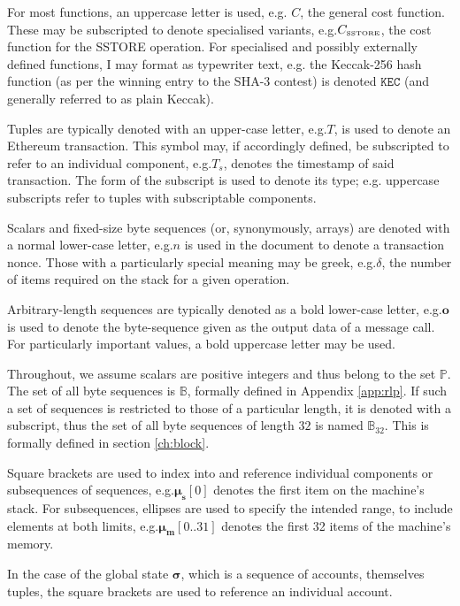 \documentclass[9pt,oneside]{amsart}
\makeatletter
\newcommand*\eg{e.g.\@\xspace}
\makeatother
\begin{document}
\begin{multicols}{2}
For most functions, an uppercase letter is used, e.g. $C$, the general cost function. These may be subscripted to denote specialised variants, \eg $C_\text{\tiny SSTORE}$, the cost function for the {\tiny SSTORE} operation. For specialised and possibly externally defined functions, I may format as typewriter text, \eg the Keccak-256 hash function (as per the winning entry to the SHA-3 contest) is denoted $\texttt{KEC}$ (and generally referred to as plain Keccak).

Tuples are typically denoted with an upper-case letter, \eg $T$, is used to denote an Ethereum transaction. This symbol may, if accordingly defined, be subscripted to refer to an individual component, \eg $T_s$, denotes the timestamp of said transaction. The form of the subscript is used to denote its type; \eg uppercase subscripts refer to tuples with subscriptable components.

Scalars and fixed-size byte sequences (or, synonymously, arrays) are denoted with a normal lower-case letter, \eg $n$ is used in the document to denote a transaction nonce. Those with a particularly special meaning may be greek, \eg $\delta$, the number of items required on the stack for a given operation.

Arbitrary-length sequences are typically denoted as a bold lower-case letter, \eg $\mathbf{o}$ is used to denote the byte-sequence given as the output data of a message call. For particularly important values, a bold uppercase letter may be used.

Throughout, we assume scalars are positive integers and thus belong to the set $\mathbb{P}$. The set of all byte sequences is $\mathbb{B}$, formally defined in Appendix \ref{app:rlp}. If such a set of sequences is restricted to those of a particular length, it is denoted with a subscript, thus the set of all byte sequences of length $32$ is named $\mathbb{B}_{32}$. This is formally defined in section \ref{ch:block}.

Square brackets are used to index into and reference individual components or subsequences of sequences, \eg $\boldsymbol{\mu}_\mathbf{s}[0]$ denotes the first item on the machine's stack. For subsequences, ellipses are used to specify the intended range, to include elements at both limits, \eg $\boldsymbol{\mu}_\mathbf{m}[0..31]$ denotes the first 32 items of the machine's memory.

In the case of the global state $\boldsymbol{\sigma}$, which is a sequence of accounts, themselves tuples, the square brackets are used to reference an individual account.


\end{multicols}
\end{document}
